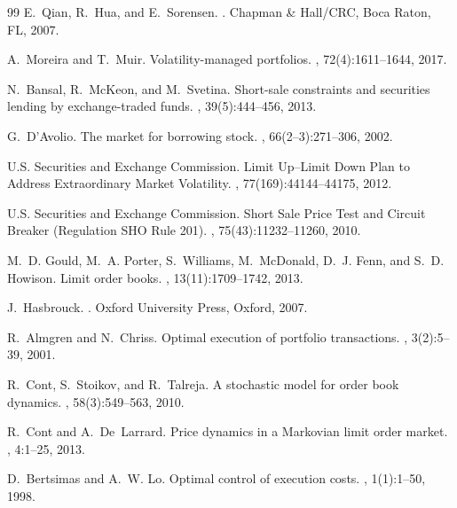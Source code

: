 \documentclass[11pt,a4paper]{article}
\begin{document}
\begin{thebibliography}{99}
E.~Qian, R.~Hua, and E.~Sorensen.
.
\newblock Chapman \& Hall/CRC, Boca Raton, FL, 2007.

A.~Moreira and T.~Muir.
\newblock Volatility-managed portfolios.
, 72(4):1611--1644, 2017.

N.~Bansal, R.~McKeon, and M.~Svetina.
\newblock Short-sale constraints and securities lending by exchange-traded funds.
, 39(5):444--456, 2013.

G.~D'Avolio.
\newblock The market for borrowing stock.
, 66(2--3):271--306, 2002.

U.S. Securities and Exchange Commission.
\newblock Limit Up--Limit Down Plan to Address Extraordinary Market Volatility.
, 77(169):44144--44175, 2012.

U.S. Securities and Exchange Commission.
\newblock Short Sale Price Test and Circuit Breaker (Regulation SHO Rule 201).
, 75(43):11232--11260, 2010.

M.~D. Gould, M.~A. Porter, S.~Williams, M.~McDonald, D.~J. Fenn, and S.~D. Howison.
\newblock Limit order books.
, 13(11):1709--1742, 2013.

J.~Hasbrouck.
.
\newblock Oxford University Press, Oxford, 2007.

R.~Almgren and N.~Chriss.
\newblock Optimal execution of portfolio transactions.
, 3(2):5--39, 2001.

R.~Cont, S.~Stoikov, and R.~Talreja.
\newblock A stochastic model for order book dynamics.
, 58(3):549--563, 2010.

R.~Cont and A.~De~Larrard.
\newblock Price dynamics in a {M}arkovian limit order market.
, 4:1--25, 2013.

D.~Bertsimas and A.~W. Lo.
\newblock Optimal control of execution costs.
, 1(1):1--50, 1998.


\end{thebibliography}
\end{document}
